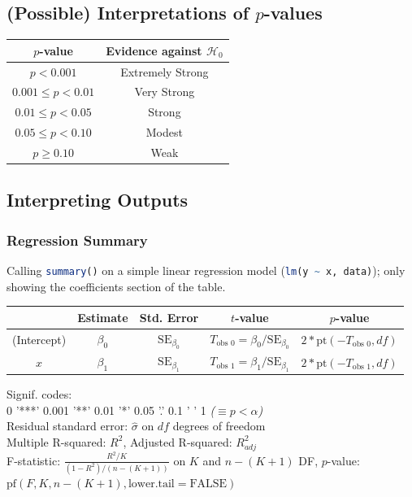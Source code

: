 \documentclass[12pt]{article}
\begin{document}
\subsection{(Possible) Interpretations of \texorpdfstring{$p$}{p}-values}

\begin{center}
    \begin{tabular}{|c | c |} 
        \hline
        \textbf{$p$-value} & \textbf{Evidence against $\mathcal{H}_0$}\\
        \hline\hline
        $p < 0.001$ & Extremely Strong\\
        \hline
        $0.001 \leq p < 0.01$ & Very Strong\\
        \hline
        $0.01 \leq p < 0.05$ & Strong\\
        \hline
        $0.05 \leq p < 0.10$ & Modest\\
        \hline
        $p \geq 0.10$ & Weak\\
        \hline
    \end{tabular}
\end{center}

\subsection{Interpreting Outputs}
\subsubsection{Regression Summary}
Calling \lstinline[language=R]{summary()} on a simple linear regression model (\lstinline[language=R]{lm(y ~ x, data)}); only showing the coefficients section of the table.

\begin{center}
    \begin{tabular}{c | c | c | c | c}
        & Estimate & Std. Error & $t$-value & $p$-value\\
        \hline
        (Intercept) & $\beta_0$ & $\text{SE}_{\beta_0}$ & $T_{\text{obs 0}} = \beta_0/\text{SE}_{\beta_0}$ & $2*\text{pt}(-T_{\text{obs 0}}, df)$\\
        $x$ & $\beta_1$ & $\text{SE}_{\beta_1}$ & $T_{\text{obs 1}} = \beta_1/\text{SE}_{\beta_1}$ & $2*\text{pt}(-T_{\text{obs 1}}, df)$ \\
        \hline
    \end{tabular}
\end{center}
Signif. codes:\\
0 '***' 0.001 '**' 0.01 '*' 0.05 '.' 0.1 ' ' 1 \textit{($\equiv p<\alpha$)}\\
Residual standard error: $\hat{\sigma}$ on $df$ degrees of freedom\\
Multiple R-squared: $R^2$, Adjusted R-squared: $R^2_{adj}$\\
F-statistic: $\frac{R^2/K}{(1 - R^2)/(n - (K + 1))}$ on $K$ and $n - (K + 1)$ DF, $p$-value: $\text{pf}(F, K, n - (K + 1), \text{lower.tail}=\text{FALSE})$\\
\end{document}
